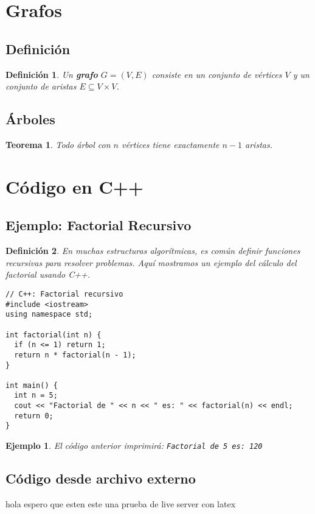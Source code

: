 \documentclass[11pt]{article}
\newtheorem{definition}{Definición}[section]
\newtheorem{theorem}{Teorema}[section]
\newtheorem{example}{Ejemplo}[section]
\begin{document}
\section{Grafos}
\subsection{Definición}
\begin{definition}
Un \textbf{grafo} $G = (V, E)$ consiste en un conjunto de vértices $V$ y un conjunto de aristas $E \subseteq V \times V$.
\end{definition}

\subsection{Árboles}
\begin{theorem}
Todo árbol con $n$ vértices tiene exactamente $n - 1$ aristas.
\end{theorem}

\section{Código en C++}
\subsection{Ejemplo: Factorial Recursivo}

\begin{definition}
En muchas estructuras algorítmicas, es común definir funciones recursivas para resolver problemas. Aquí mostramos un ejemplo del cálculo del factorial usando C++.
\end{definition}

\begin{lstlisting}
// C++: Factorial recursivo
#include <iostream>
using namespace std;

int factorial(int n) {
  if (n <= 1) return 1;
  return n * factorial(n - 1);
}

int main() {
  int n = 5;
  cout << "Factorial de " << n << " es: " << factorial(n) << endl;
  return 0;
}
\end{lstlisting}

\begin{example}
El código anterior imprimirá: \texttt{Factorial de 5 es: 120}
\end{example}

\subsection{Código desde archivo externo}


hola espero que esten este una prueba de live server con latex
\end{document}
